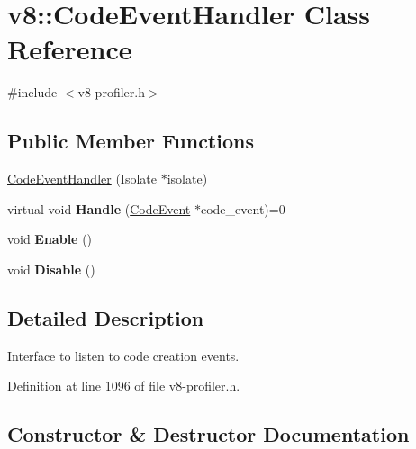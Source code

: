 \hypertarget{classv8_1_1CodeEventHandler}{}\section{v8\+:\+:Code\+Event\+Handler Class Reference}
\label{classv8_1_1CodeEventHandler}


{\ttfamily \#include $<$v8-\/profiler.\+h$>$}

\subsection*{Public Member Functions}
\begin{DoxyCompactItemize}
\item 
\mbox{\hyperlink{classv8_1_1CodeEventHandler_a3d88d7de87c3b51d964ab5c8cc06dc03}{Code\+Event\+Handler}} (Isolate $\ast$isolate)
\item 
\mbox{\label{classv8_1_1CodeEventHandler_a61d0870a92c4b814ea5dbe29acf463c6}} 
virtual void {\bfseries Handle} (\mbox{\hyperlink{classv8_1_1CodeEvent}{Code\+Event}} $\ast$code\+\_\+event)=0
\item 
\mbox{\label{classv8_1_1CodeEventHandler_a3691182a45ff92e7d421c3a17bda305f}} 
void {\bfseries Enable} ()
\item 
\mbox{\label{classv8_1_1CodeEventHandler_a9024641a77703a601dcdf840b888ff05}} 
void {\bfseries Disable} ()
\end{DoxyCompactItemize}


\subsection{Detailed Description}
Interface to listen to code creation events. 

Definition at line 1096 of file v8-\/profiler.\+h.



\subsection{Constructor \& Destructor Documentation}
\mbox{\label{classv8_1_1CodeEventHandler_a3d88d7de87c3b51d964ab5c8cc06dc03}} 
